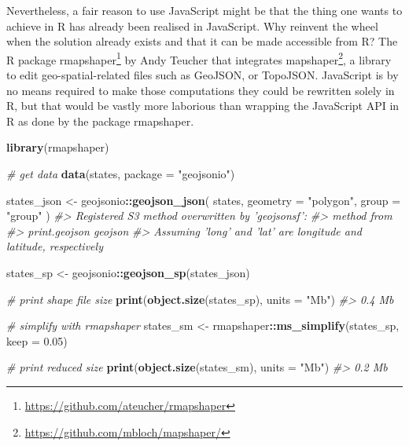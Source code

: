 \documentclass[10pt,]{krantz}
\makeatletter
\newenvironment{Shaded}{\begin{snugshade}}{\end{snugshade}}
\newcommand{\CommentTok}[1]{\textcolor[rgb]{0.37,0.37,0.37}{\textit{#1}}}
\newcommand{\DataTypeTok}[1]{\textcolor[rgb]{0.27,0.27,0.27}{#1}}
\newcommand{\FloatTok}[1]{\textcolor[rgb]{0.06,0.06,0.06}{#1}}
\newcommand{\KeywordTok}[1]{\textcolor[rgb]{0.27,0.27,0.27}{\textbf{#1}}}
\newcommand{\NormalTok}[1]{#1}
\newcommand{\OperatorTok}[1]{\textcolor[rgb]{0.43,0.43,0.43}{\textbf{#1}}}
\newcommand{\StringTok}[1]{\textcolor[rgb]{0.5,0.5,0.5}{#1}}
\renewcommand{\href}[2]{#2\footnote{\url{#1}}}
\newenvironment{kframe}{%
\medskip{}
\setlength{\fboxsep}{.8em}
 \def\at@end@of@kframe{}%
 \ifinner\ifhmode%
  \def\at@end@of@kframe{\end{minipage}}%
  \begin{minipage}{\columnwidth}%
 \fi\fi%
 \def\FrameCommand##1{\hskip\@totalleftmargin \hskip-\fboxsep
 \colorbox{shadecolor}{##1}\hskip-\fboxsep
     \hskip-\linewidth \hskip-\@totalleftmargin \hskip\columnwidth}%
 \MakeFramed {\advance\hsize-\width
   \@totalleftmargin\z@ \linewidth\hsize
   \@setminipage}}%
 {\par\unskip\endMakeFramed%
 \at@end@of@kframe}
\renewenvironment{Shaded}{\begin{kframe}}{\end{kframe}}
\makeatother
\begin{document}
Nevertheless, a fair reason to use JavaScript might be that the thing one wants to achieve in R has already been realised in JavaScript. Why reinvent the wheel when the solution already exists and that it can be made accessible from R? The R package \href{https://github.com/ateucher/rmapshaper}{rmapshaper} \citep{R-rmapshaper} by Andy Teucher that integrates \href{https://github.com/mbloch/mapshaper/}{mapshaper}, a library to edit geo-spatial-related files such as GeoJSON, or TopoJSON. JavaScript is by no means required to make those computations they could be rewritten solely in R, but that would be vastly more laborious than wrapping the JavaScript API in R as done by the package rmapshaper.

\begin{Shaded}
\begin{Highlighting}[]
\KeywordTok{library}\NormalTok{(rmapshaper)}

\CommentTok{# get data}
\KeywordTok{data}\NormalTok{(states, }\DataTypeTok{package =} \StringTok{"geojsonio"}\NormalTok{)}

\NormalTok{states_json <-}\StringTok{ }\NormalTok{geojsonio}\OperatorTok{::}\KeywordTok{geojson_json}\NormalTok{(}
\NormalTok{  states, }
  \DataTypeTok{geometry =} \StringTok{"polygon"}\NormalTok{, }
  \DataTypeTok{group =} \StringTok{"group"}
\NormalTok{)}
\CommentTok{#> Registered S3 method overwritten by 'geojsonsf':}
\CommentTok{#>   method        from   }
\CommentTok{#>   print.geojson geojson}
\CommentTok{#> Assuming 'long' and 'lat' are longitude and latitude, respectively}

\NormalTok{states_sp <-}\StringTok{ }\NormalTok{geojsonio}\OperatorTok{::}\KeywordTok{geojson_sp}\NormalTok{(states_json)}

\CommentTok{# print shape file size}
\KeywordTok{print}\NormalTok{(}\KeywordTok{object.size}\NormalTok{(states_sp), }\DataTypeTok{units =} \StringTok{"Mb"}\NormalTok{)}
\CommentTok{#> 0.4 Mb}

\CommentTok{# simplify with rmapshaper}
\NormalTok{states_sm <-}\StringTok{ }\NormalTok{rmapshaper}\OperatorTok{::}\KeywordTok{ms_simplify}\NormalTok{(states_sp, }\DataTypeTok{keep =} \FloatTok{0.05}\NormalTok{)}

\CommentTok{# print reduced size}
\KeywordTok{print}\NormalTok{(}\KeywordTok{object.size}\NormalTok{(states_sm), }\DataTypeTok{units =} \StringTok{"Mb"}\NormalTok{)}
\CommentTok{#> 0.2 Mb}
\end{Highlighting}
\end{Shaded}
\end{document}

